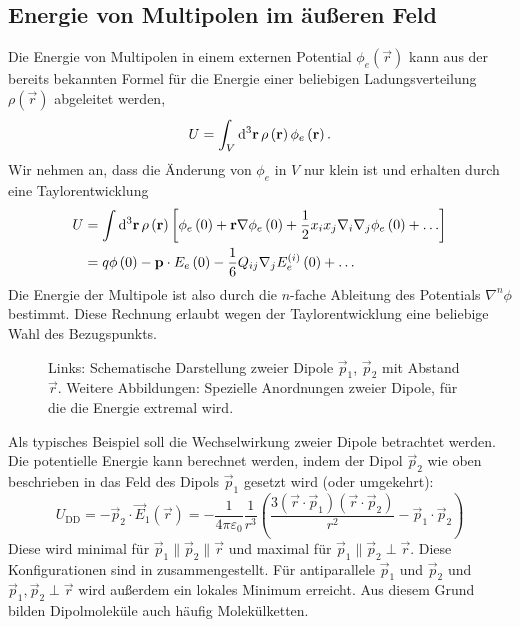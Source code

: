 \subsection{Energie von Multipolen im äußeren Feld}

Die Energie von Multipolen in einem externen Potential $\phi _{e}\left(\vec {r}\right)$ kann aus der bereits bekannten Formel für die Energie einer beliebigen Ladungsverteilung $\rho \left(\vec {r}\right)$ abgeleitet werden,
\begin{equation*}
	U=\int _{V}\diffa[3]{\vec{r}}\rho \left(\vec {r}\right)\phi _{e}\left(\vec {r}\right).
\end{equation*}
Wir nehmen an, dass die Änderung von $\phi _{e}$ in $V$ nur klein ist und erhalten durch eine Taylorentwicklung
\begin{align*}
	U & =\int \diffa[3]{\vec{r}}\rho \left(\vec {r}\right)\left[\phi _{e}\left(0\right)+\vec {r}\nabla \phi _{e}\left(0\right)+\frac{1}{2}x_{i}x_{j}\nabla _{i}\nabla _{j}\phi _{e}\left(0\right)+\ldots \right] \\&=q\phi \left(0\right)-\vec {p}\cdot E_{e}\left(0\right)-\frac{1}{6}Q_{ij}\nabla _{j}E_{e}^{\left(i\right)}\left(0\right)+\ldots
\end{align*}
Die Energie der Multipole ist also durch die $n$-fache Ableitung des Potentials $\nabla ^{n}\phi $ bestimmt. Diese Rechnung erlaubt wegen der Taylorentwicklung eine beliebige Wahl des Bezugspunkts.

\begin{figure}[htb]
	\centering
	\tfigDipoles
	\caption{Links: Schematische Darstellung zweier Dipole $\vec p_1$, $\vec p_2$ mit Abstand $\vec r$. Weitere Abbildungen: Spezielle Anordnungen zweier Dipole, für die die Energie extremal wird. }
	\label{fig:dipoles}
\end{figure}

Als typisches Beispiel soll die Wechselwirkung zweier Dipole betrachtet werden. Die potentielle Energie kann berechnet werden, indem der Dipol $\vec {p}_{2}$ wie oben beschrieben in das Feld des Dipols $\vec {p}_{1}$ gesetzt wird (oder umgekehrt):
\begin{equation*}
	U_{\mathrm{DD}}=-\vec {p}_{2}\cdot \vec {E}_{1}\left(\vec {r}\right)=-\frac{1}{4\pi \varepsilon _{0}}\frac{1}{r^{3}}\left(\frac{3\left(\vec {r}\cdot \vec {p}_{1}\right)\left(\vec {r}\cdot \vec {p}_{2}\right)}{r^{2}}-\vec {p}_{1}\cdot \vec {p}_{2}\right)
\end{equation*}
Diese wird minimal für $\vec {p}_{1}\parallel \vec {p}_{2}\parallel \vec {r}$ und maximal für $\vec {p}_{1}\parallel \vec {p}_{2}\perp \vec {r}$. Diese Konfigurationen sind in  zusammengestellt. Für antiparallele $\vec {p}_{1}$ und $\vec {p}_{2}$ und $\vec {p}_{1},\vec {p}_{2}\perp \vec {r}$ wird außerdem ein lokales Minimum erreicht. Aus diesem Grund bilden Dipolmoleküle auch häufig Molekülketten.

